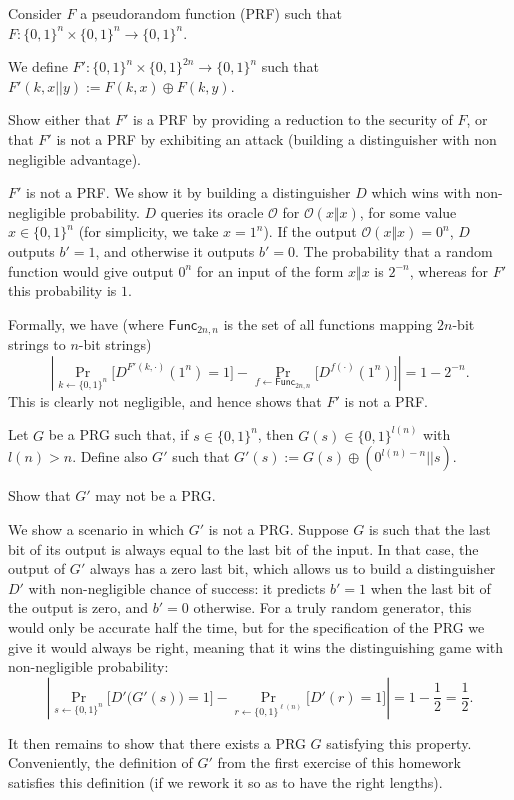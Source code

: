 \documentclass[12pt, answers]{exam}
\newcommand{\abs}[1]{\left\lvert#1\right\lvert}
\begin{document}
\begin{questions}
\newpage

Consider $F$ a pseudorandom function (PRF) such that $F:\{0,1\}^n\times \{0,1\}^n \longrightarrow \{0,1\}^n$.

We define $F':\{0,1\}^n\times \{0,1\}^{2n} \longrightarrow \{0,1\}^n$ such that $F'(k, x||y):= F(k,x)\oplus F(k,y)$.

Show either that $F'$ is a PRF by providing a reduction to the security of $F$, or that $F'$ is not a PRF by exhibiting an attack (building a distinguisher with non negligible advantage).

\begin{solutionbox}{15cm}
	\(F'\) is not a PRF.
	We show it by building a distinguisher \(D\) which wins with non-negligible probability.
	\(D\) queries its oracle \(\mathcal{O}\) for \(\mathcal{O}(x \Vert x)\), for some value \(x \in \{0, 1\}^n\) (for simplicity, we take \(x = 1^n\)).
	If the output \(\mathcal{O}(x \Vert x) = 0^n\), \(D\) outputs \(b' = 1\), and otherwise it outputs \(b' = 0\).
	The probability that a random function would give output \(0^n\) for an input of the form \(x \Vert x\) is \(2^{-n}\), whereas for \(F'\) this probability is \(1\).
	
	Formally, we have (where \(\mathsf{Func}_{2n, n}\) is the set of all functions mapping \(2n\)-bit strings to \(n\)-bit strings)
	\[\abs{\Pr_{k \gets \{0, 1\}^n} \Big[D^{F'(k, \cdot)}(1^n) = 1\Big] - \Pr_{f \gets \mathsf{Func}_{2n, n}} \Big[D^{f(\cdot)}(1^n)\Big]} = 1 - 2^{-n}.
	\]
	This is clearly not negligible, and hence shows that \(F'\) is not a PRF.
\end{solutionbox}

\newpage


Let $G$ be a PRG such that, if $s\in\{0,1\}^n$, then $G(s)\in\{0,1\}^{l(n)}$ with $l(n)>n$.
Define also $G'$ such that $G'(s):= G(s)\oplus(0^{l(n)-n}||s)$.

Show that $G'$ may not be a PRG.
\begin{solutionbox}{15cm}
	We show a scenario in which \(G'\) is not a PRG.
	Suppose \(G\) is such that the last bit of its output is always equal to the last bit of the input.
	In that case, the output of \(G'\) always has a zero last bit, which allows us to build a distinguisher \(D'\) with non-negligible chance of success: it predicts \(b' = 1\) when the last bit of the output is zero, and \(b' = 0\) otherwise.
	For a truly random generator, this would only be accurate half the time, but for the specification of the PRG we give it would always be right, meaning that it wins the distinguishing game with non-negligible probability:
	\[
	\abs{\Pr_{s \gets \{0, 1\}^n}\Big[D'\big(G'(s)\big) = 1\Big] - \Pr_{r \gets \{0, 1\}^{\ell(n)}}\Big[D'(r) = 1\Big]} = 1 - \frac{1}{2} = \frac{1}{2}.
	\]
	
	It then remains to show that there exists a PRG \(G\) satisfying this property.
	Conveniently, the definition of \(G'\) from the first exercise of this homework satisfies this definition (if we rework it so as to have the right lengths).
\end{solutionbox}
\end{questions}

  
\end{document}
